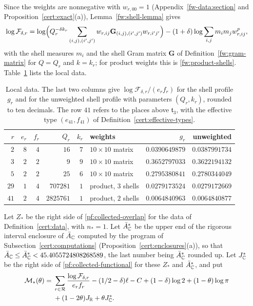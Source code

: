 Since the weights are nonnegative with $w_{r,00}=1$ (Appendix~\ref{fw-data:section}
and Proposition~\ref{cert:exact}(a)), Lemma~\ref{fw:shell-lemma} gives
\begin{equation}\label{cert:finite-factor}
 \log\mathcal F_{\delta,r}
 =\log\Bigl(Q_r^{-\delta k_r}\sum_{(i,j),(i',j')}w_{r,ij}\mathbf G_{(i,j),(i',j')}w_{r,i'j'}\Bigr)
 -(1+\delta)\log\sum_{i,j}m_im_jw_{r,ij}^p,
\end{equation}
with the shell measures $m_i$ and the shell Gram matrix $\mathbf G$ of
Definition~\ref{fw:gram-matrix} for $Q=Q_r$ and $k=k_r$; for product weights this is
\eqref{fw:product-shells}. Table~\ref{cert:tab-local} lists the local data.

\begin{table}[htbp]
\centering\small
\caption{Local data. The last two columns give
$\log\mathcal F_{\delta,r}/(e_rf_r)$ for the shell profile $g_r$ and for
the unweighted shell profile with parameters $(Q_r,k_r)$, rounded to ten
decimals. The row $41$ refers to the places above $\mathfrak t_3$, with the
effective type $(e_{41},f_{41})$ of Definition~\ref{cert:effective-types}.}
\label{cert:tab-local}
\begin{tabular}{rrrrrlrr}
\toprule
$r$ & $e_r$ & $f_r$ & $Q_r$ & $k_r$ & weights & $g_r$ & unweighted\\
\midrule
$2$ & $8$ & $4$ & $16$ & $7$ & $10\times10$ matrix & $0.0390649879$ & $0.0387991734$\\
$3$ & $2$ & $2$ & $9$ & $9$ & $10\times10$ matrix & $0.3652797033$ & $0.3622194132$\\
$5$ & $2$ & $2$ & $25$ & $6$ & $10\times10$ matrix & $0.2795380841$ & $0.2780344049$\\
$29$ & $1$ & $4$ & $707281$ & $1$ & product, $3$ shells & $0.0279173524$ & $0.0279172669$\\
$41$ & $2$ & $4$ & $2825761$ & $1$ & product, $2$ shells & $0.0064840963$ & $0.0064840877$\\
\bottomrule
\end{tabular}
\end{table}

\begin{definition}\label{cert:lower-bounds}
Let $Z_*$ be the right side of \eqref{pf:collected-overlap} for the data
of Definition~\ref{cert:data}, with $n_*=1$. Let $\bar A_\mathbb C^*$ be the
upper end of the rigorous interval enclosure of $\bar A_\mathbb C$ computed by
the program of Subsection~\ref{cert:computations}
(Proposition~\ref{cert:enclosures}(a)), so that
$\bar A_\mathbb C\le\bar A_\mathbb C^*<45.4055724808268589$, the last number being
$\bar A_\mathbb C^*$ rounded up. Let $J_\mathbb C^*$ be the right side of
\eqref{pf:collected-functional} for these $Z_*$ and $\bar A_\mathbb C^*$, and put
\[
 \begin{split}
 \mathcal M_*(\theta)={}&\sum_{r\in\mathcal R}
 \frac{\log\mathcal F_{\delta,r}}{e_rf_r}
 -(1/2-\delta)\ell-C+(1-\delta)\log2+(1-\theta)\log\pi\\
 &+(1-2\theta)J_\mathbb R+\theta J_\mathbb C^* .
 \end{split}
\]
\end{definition}

